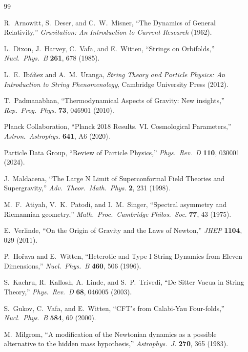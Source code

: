\documentclass[12pt,a4paper]{article}
\begin{document}
\begin{thebibliography}{99}

 R.~Arnowitt, S.~Deser, and C.~W.~Misner,
``The Dynamics of General Relativity,''
\textit{Gravitation: An Introduction to Current Research} (1962).

 L.~Dixon, J.~Harvey, C.~Vafa, and E.~Witten,
``Strings on Orbifolds,''
\textit{Nucl.\ Phys.\ B} \textbf{261}, 678 (1985).

 L.~E.~Ib\'a\~nez and A.~M.~Uranga,
\textit{String Theory and Particle Physics: An Introduction to String Phenomenology},
Cambridge University Press (2012).

 T.~Padmanabhan,
``Thermodynamical Aspects of Gravity: New insights,''
\textit{Rep.\ Prog.\ Phys.} \textbf{73}, 046901 (2010).

 Planck Collaboration,
``Planck 2018 Results. VI. Cosmological Parameters,''
\textit{Astron.\ Astrophys.} \textbf{641}, A6 (2020).

 Particle Data Group,
``Review of Particle Physics,''
\textit{Phys.\ Rev.\ D} \textbf{110}, 030001 (2024).

 J.~Maldacena,
``The Large N Limit of Superconformal Field Theories and Supergravity,''
\textit{Adv.\ Theor.\ Math.\ Phys.} \textbf{2}, 231 (1998).

 M.~F.~Atiyah, V.~K.~Patodi, and I.~M.~Singer,
``Spectral asymmetry and Riemannian geometry,''
\textit{Math.\ Proc.\ Cambridge Philos.\ Soc.} \textbf{77}, 43 (1975).

 E.~Verlinde,
``On the Origin of Gravity and the Laws of Newton,''
\textit{JHEP} \textbf{1104}, 029 (2011).

 P.~Ho\v{r}ava and E.~Witten,
``Heterotic and Type I String Dynamics from Eleven Dimensions,''
\textit{Nucl.\ Phys.\ B} \textbf{460}, 506 (1996).

 S.~Kachru, R.~Kallosh, A.~Linde, and S.~P.~Trivedi,
``De Sitter Vacua in String Theory,''
\textit{Phys.\ Rev.\ D} \textbf{68}, 046005 (2003).

 S.~Gukov, C.~Vafa, and E.~Witten,
``CFT's from Calabi-Yau Four-folds,''
\textit{Nucl.\ Phys.\ B} \textbf{584}, 69 (2000).

 M.~Milgrom,
``A modification of the Newtonian dynamics as a possible alternative to the hidden mass hypothesis,''
\textit{Astrophys.\ J.} \textbf{270}, 365 (1983).


\end{thebibliography}
\end{document}

